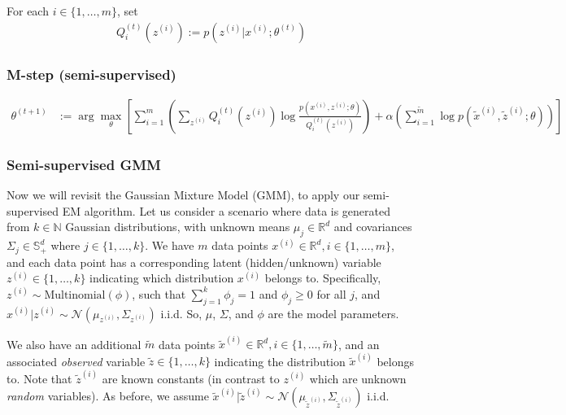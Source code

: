 For each $i \in \{1,\ldots,m\}$, set
\begin{align*}
    Q_i^{(t)}(z^{(i)}) := p(z^{(i)}|x^{(i)};\theta^{(t)})
\end{align*}

\subsubsection*{M-step (semi-supervised)}

\begin{align*}
    \theta^{(t+1)} &:= \arg\max_\theta\left[ \sum_{i=1}^m\left( \sum_{z^{(i)}} Q^{(t)}_i(z^{(i)}) \log \frac{ p(x^{(i)}, z^{(i)};\theta) }{ Q^{(t)}_i(z^{(i)})}\right)  + \alpha \left(\sum_{i=1}^{\tilde{m}} \log p(\tilde{x}^{(i)},\tilde{z}^{(i)};\theta)\right)\right]
\end{align*}

\begin{enumerate}
   
\end{enumerate}

\ifnum{} {
  \clearpage
} \fi
\subsubsection*{Semi-supervised GMM}
Now we will revisit the Gaussian Mixture Model (GMM), to apply our semi-supervised EM algorithm. Let us consider a scenario where data is generated from $k \in \mathbb{N}$ Gaussian distributions, with unknown means $\mu_j \in \mathbb{R}^d$ and covariances $\Sigma_j \in \mathbb{S}_+^d$ where $j \in \{1,\ldots,k\}$. We have $m$ data points $x^{(i)} \in \mathbb{R}^d, i \in \{1,\ldots,m\}$, and each data point has a corresponding latent (hidden/unknown) variable $z^{(i)} \in \{1,\ldots,k\}$ indicating which distribution $x^{(i)}$ belongs to. Specifically, $z^{(i)} \sim \text{Multinomial}(\phi)$, such that $\sum_{j=1}^k\phi_j = 1$ and $\phi_j \ge 0$ for all $j$, and $x^{(i)}|z^{(i)} \sim \mathcal{N}\left(\mu_{z^{(i)}}, \Sigma_{z^{(i)}}\right)$ i.i.d. So, $\mu$, $\Sigma$, and $\phi$ are the model parameters.

We also have an additional $\tilde{m}$ data points $\tilde{x}^{(i)} \in \mathbb{R}^d, i \in \{1,\ldots,\tilde{m}\}$, and an associated \emph{observed} variable $\tilde{z} \in \{1,\ldots,k\}$ indicating the distribution $\tilde{x}^{(i)}$ belongs to. Note that $\tilde{z}^{(i)}$ are known constants (in contrast to $z^{(i)}$ which are unknown \emph{random} variables). As before, we assume $\tilde{x}^{(i)}|\tilde{z}^{(i)} \sim \mathcal{N}\left(\mu_{\tilde{z}^{(i)}}, \Sigma_{\tilde{z}^{(i)}}\right)$ i.i.d.



